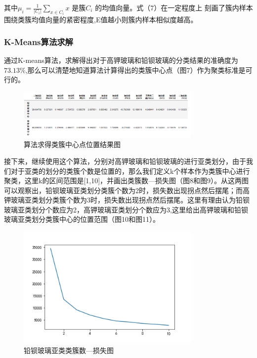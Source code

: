 \documentclass[withoutpreface,bwprint]{cumcmthesis}%
\begin{document}
	其中$\mu_{i} = \frac{1}{|C_{i}|}\sum_{x \in C_{i}}x$ 是簇$C_{i}$ 的均值向量。式（7）在一定程度上
	刻画了簇内样本围绕类簇均值向量的紧密程度,E值越小则簇内样本相似度越高。
	
	\subsubsection{K-Means算法求解}
	通过K-means算法，求解得出对于高钾玻璃和铅钡玻璃的分类结果的准确度为$73.13\%$,那么可以清楚地知道算法计算得出的类簇中心点（图7）作为聚类标准是可行的。
	
	\begin{figure}[!h]
		\centering
		\includegraphics[width=0.8\textwidth]{ph7}
		\caption{算法求得类簇中心点位置结果图}
		\label{fig:ph7}
	\end{figure}
    
    接下来，继续使用这个算法，分别对高钾玻璃和铅钡玻璃的进行亚类划分，由于我们对于亚类的划分的类簇个数是位置的，那么我们定义k个样本作为类簇中心进行聚类，这里k的区间范围是[1,10]，并画出类簇数—损失图（图8和图9）。从这两图可以观察出，铅钡玻璃亚类划分类簇个数为2时，损失数出现拐点然后摆尾；而高钾玻璃亚类划分类簇个数为3时，损失数出现拐点然后摆尾。这里有理由认为铅钡玻璃亚类划分个数应为2，高钾玻璃亚类划分个数应为3,这里给出高钾玻璃和铅钡玻璃亚类划分类簇中心的位置范围（图10和图11）。
    
    \begin{figure}[!h]
    	\centering
    	\includegraphics[width=0.8\textwidth]{ph8}
    	\caption{铅钡玻璃亚类类簇数—损失图}
    	\label{fig:ph7}
    \end{figure}
\end{document}
